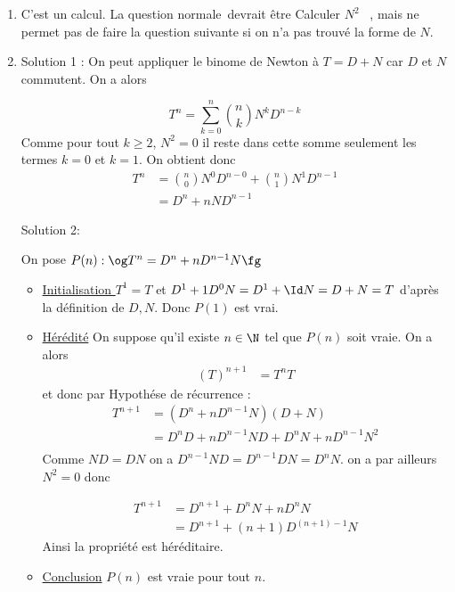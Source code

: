 \begin{correction}
\begin{enumerate}
\item C'est un calcul. La question \og normale\fg\,  devrait être \og Calculer $N^2$ \fg \,  , mais ne permet pas de faire la question suivante si on n'a pas trouvé la forme de $N$. 

\item Solution 1 : On peut appliquer le binome de Newton à $T= D+N$   car $D$ et $N$ commutent. On a alors 

$$T^n =\sum_{k=0}^n \binom{n}{k} N^k D^{n-k}$$
Comme pour tout $k\geq 2$, $N^2=0$ il reste dans cette somme seulement les termes $k=0$ et $k=1$. On obtient donc 
\begin{align*}
T^n  &= \binom{n}{0} N^0 D^{n-0}+ \binom{n}{1} N^1 D^{n-1}\\
		&=D^n + nND^{n-1}
\end{align*}






Solution 2: 

On pose $P(n) : \og  T^n =D^n +n D^{n-1} N \fg$

\begin{itemize}
\item \underline{Initialisation }
$T^1 =T$ et $D^1+1D^0 N = D^1 +\Id N=D+N =T$ d'après la définition de $D,N$.
Donc $P(1) $ est vrai. 

\item \underline{Hérédité} On suppose qu'il existe $n\in \N$ tel que $P(n)$ soit vraie. 
On a alors 
\begin{align*}
 (T)^{n+1}&=  T^n  T
\end{align*}
et donc par Hypothése de récurrence : 
\begin{align*}
 T^{n+1}&= (D^n +nD^{n-1} N)(D+N)\\
 							&=  D^n D +n D^{n-1} N D + D^n N + nD^{n-1}N^2\\
\end{align*}
Comme $ND=DN$ on a $D^{n-1} N D= D^{n-1} DN  =D^{n} N$.  on a par ailleurs $N^2=0$ donc 

\begin{align*}
 T^{n+1}&=D^{n+1} +D^n N +nD^n N\\
 			&=D^{n+1} + (n+1) D^{(n+1)-1} N 
\end{align*}
Ainsi la propriété est héréditaire. 

\item \underline{Conclusion} $P(n)$ est vraie pour tout $n$. 
\end{itemize}


\end{enumerate}
\end{correction}
